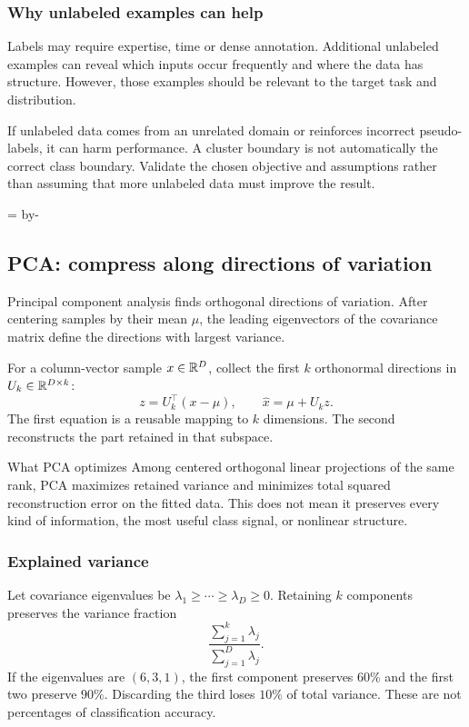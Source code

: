 \documentclass[11pt]{article}
\newcommand{\newsubsection}[1]{\par\begingroup\skip0=\pagegoal\advance\skip0 by-\pagetotal\ifdim\skip0<12\baselineskip\newpage\fi\endgroup\subsection{#1}}
\begin{document}
\subsubsection{Why unlabeled examples can help}
Labels may require expertise, time or dense annotation. Additional unlabeled examples can reveal which inputs occur frequently and where the data has structure. However, those examples should be relevant to the target task and distribution.

If unlabeled data comes from an unrelated domain or reinforces incorrect pseudo-labels, it can harm performance. A cluster boundary is not automatically the correct class boundary. Validate the chosen objective and assumptions rather than assuming that more unlabeled data must improve the result.

\newsubsection{PCA: compress along directions of variation}
Principal component analysis finds orthogonal directions of variation. After centering samples by their mean $\mu$, the leading eigenvectors of the covariance matrix define the directions with largest variance.

For a column-vector sample $x\in\mathbb{R}^D$, collect the first $k$ orthonormal directions in $U_k\in\mathbb{R}^{D\times k}$:
\[
z=U_k^\top(x-\mu),\qquad
\widehat{x}=\mu+U_kz.
\]
The first equation is a reusable mapping to $k$ dimensions. The second reconstructs the part retained in that subspace.

\begin{keyidea}{What PCA optimizes}
Among centered orthogonal linear projections of the same rank, PCA maximizes retained variance and minimizes total squared reconstruction error on the fitted data. This does not mean it preserves every kind of information, the most useful class signal, or nonlinear structure.
\end{keyidea}

\subsubsection{Explained variance}
Let covariance eigenvalues be $\lambda_1\geq\cdots\geq\lambda_D\geq0$. Retaining $k$ components preserves the variance fraction
\[
\frac{\sum_{j=1}^{k}\lambda_j}{\sum_{j=1}^{D}\lambda_j}.
\]
If the eigenvalues are $(6,3,1)$, the first component preserves $60\%$ and the first two preserve $90\%$. Discarding the third loses $10\%$ of total variance. These are not percentages of classification accuracy.
\end{document}
